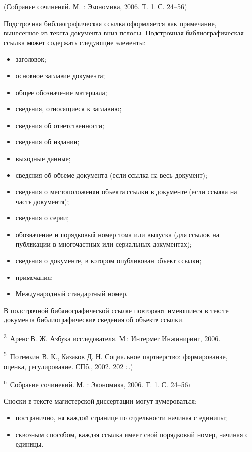 \documentclass[12pt,a4paper, oneside]{extreport}
\begin{document}
(Собрание сочинений. М. : Экономика, 2006.  Т. 1. С. 24–56)



Подстрочная библиографическая ссылка оформляется как примечание, вынесенное из текста документа вниз полосы.
Подстрочная библиографическая ссылка может содержать следующие элементы:
\begin{itemize}
\item заголовок;
\item основное заглавие документа;
\item общее обозначение материала;
\item сведения, относящиеся к заглавию;
\item сведения об ответственности;
\item сведения об издании;
\item выходные данные;
\item сведения об объеме документа (если ссылка на весь документ);
\item сведения о местоположении объекта ссылки в документе (если ссылка на часть документа);
\item сведения о серии;
\item обозначение и порядковый номер тома или выпуска (для ссылок на публикации в многочастных или сериальных документах);
\item сведения о документе, в котором опубликован объект ссылки;
\item примечания;
\item Международный стандартный номер.
\end{itemize}

В подстрочной библиографической ссылке повторяют имеющиеся в тексте документа библиографические сведения об объекте ссылки.

\textsuperscript{3}~Аренс В. Ж. Азбука исследователя. М.: Интермет Инжиниринг, 2006.

\textsuperscript{5}~Потемкин В. К., Казаков Д. Н. Социальное партнерство: формирование, оценка, регулирование. СПб., 2002. 202 с.)

\textsuperscript{6}~Собрание сочинений. М. : Экономика, 2006.  Т. 1. С. 24–56)

Сноски в тексте магистерской диссертации могут нумероваться:
\begin{itemize}
\item постранично, на каждой странице по отдельности начиная с единицы;
\item сквозным способом, каждая ссылка имеет свой порядковый номер, начиная с единицы.
\end{itemize}
\end{document}
